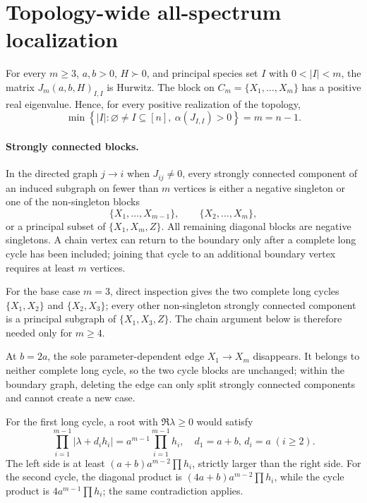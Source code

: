 \section*{Topology-wide all-spectrum localization}
\begin{theorem}
For every $m\geq3$, $a,b>0$, $H\succ0$, and principal species set $I$ with
$0<|I|<m$, the matrix $J_m(a,b,H)_{I,I}$ is Hurwitz.  The block on
$C_m=\{X_1,\ldots,X_m\}$ has a positive real eigenvalue.  Hence, for every
positive realization of the topology,
\[
\min\left\{|I|:\varnothing\ne I\subseteq[n],\
\alpha(J_{I,I})>0\right\}=m=n-1.
\]
\end{theorem}

\paragraph{Strongly connected blocks.}
In the directed graph $j\to i$ when $J_{ij}\neq0$, every strongly connected
component of an induced subgraph on fewer than $m$ vertices is either a
negative singleton or one of the non-singleton blocks
\[
\{X_1,\ldots,X_{m-1}\},\qquad
\{X_2,\ldots,X_m\},
\]
or a principal subset of $\{X_1,X_m,Z\}$.  All remaining diagonal blocks are
negative singletons.  A chain vertex can return to the boundary only after a
complete long cycle has been included; joining that cycle to an additional
boundary vertex requires at least $m$ vertices.

For the base case $m=3$, direct inspection gives the two complete long cycles
$\{X_1,X_2\}$ and $\{X_2,X_3\}$; every other non-singleton strongly connected
component is a principal subgraph of $\{X_1,X_3,Z\}$.  The chain argument
below is therefore needed only for $m\ge4$.

At $b=2a$, the sole parameter-dependent edge $X_1\to X_m$ disappears.  It
belongs to neither complete long cycle, so the two cycle blocks are unchanged;
within the boundary graph, deleting the edge can only split strongly connected
components and cannot create a new case.

For the first long cycle, a root with $\Re\lambda\geq0$ would satisfy
\[
\prod_{i=1}^{m-1}|\lambda+d_i h_i|
 =a^{m-1}\prod_{i=1}^{m-1}h_i,
\quad d_1=a+b,\,d_i=a\;(i\ge2).
\]
The left side is at least $(a+b)a^{m-2}\prod h_i$, strictly larger than the
right side.  For the second cycle, the diagonal product is
$(4a+b)a^{m-2}\prod h_i$, while the cycle product is
$4a^{m-1}\prod h_i$; the same contradiction applies.

